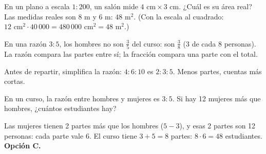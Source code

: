 \begin{ejemplo}
En un plano a escala $1 : 200$, un salón mide $4 \text{ cm} \times 3 \text{ cm}$. ¿Cuál es su área real?
\solucion Las medidas reales son $8$ m y $6$ m: $48$ m$^2$. (Con la escala al cuadrado: $12 \text{ cm}^2 \cdot 40\,000
= 480\,000$ cm$^2 = 48$ m$^2$.)
\end{ejemplo}

\begin{trampa}
En una razón $3 : 5$, los hombres no son $\tfrac35$ del curso: son $\tfrac38$ (3 de cada 8 personas). La razón compara
las partes entre sí; la fracción compara una parte con el total.
\end{trampa}

\begin{atajo}
Antes de repartir, simplifica la razón: $4 : 6 : 10$ es $2 : 3 : 5$. Menos partes, cuentas más cortas.
\end{atajo}

\begin{reto}
En un curso, la razón entre hombres y mujeres es $3 : 5$. Si hay 12 mujeres más que hombres, ¿cuántos estudiantes hay?
\end{reto}

\begin{retoresuelto}
Las mujeres tienen 2 partes más que los hombres ($5 - 3$), y esas 2 partes son 12 personas: cada parte vale 6. El curso
tiene $3 + 5 = 8$ partes: $8 \cdot 6 = 48$ estudiantes. \textbf{Opción C.}
\end{retoresuelto}

